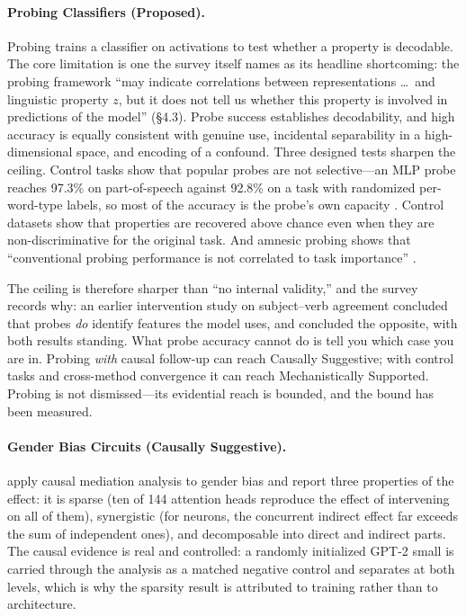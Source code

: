 \documentclass{article}
\begin{document}
\paragraph{Probing Classifiers (Proposed).} Probing \citep{belinkov2022probing} trains a classifier on activations to test whether a property is decodable. The core limitation is one the survey itself names as its headline shortcoming: the probing framework ``may indicate correlations between representations \ldots\ and linguistic property $z$, but it does not tell us whether this property is involved in predictions of the model'' (\S4.3). Probe success establishes decodability, and high accuracy is equally consistent with genuine use, incidental separability in a high-dimensional space, and encoding of a confound. Three designed tests sharpen the ceiling. Control tasks show that popular probes are not selective---an MLP probe reaches 97.3\% on part-of-speech against 92.8\% on a task with randomized per-word-type labels, so most of the accuracy is the probe's own capacity \citep{hewitt2019designing}. Control datasets show that properties are recovered above chance even when they are non-discriminative for the original task. And amnesic probing shows that ``conventional probing performance is not correlated to task importance'' \citep{elazar2021amnesic}.

The ceiling is therefore sharper than ``no internal validity,'' and the survey records why: an earlier intervention study on subject--verb agreement concluded that probes \emph{do} identify features the model uses, and \citet{elazar2021amnesic} concluded the opposite, with both results standing. What probe accuracy cannot do is tell you which case you are in. Probing \emph{with} causal follow-up can reach Causally Suggestive; with control tasks and cross-method convergence it can reach Mechanistically Supported. Probing is not dismissed---its evidential reach is bounded, and the bound has been measured.

\paragraph{Gender Bias Circuits (Causally Suggestive).} \citet{vig2020gender} apply causal mediation analysis to gender bias and report three properties of the effect: it is sparse (ten of 144 attention heads reproduce the effect of intervening on all of them), synergistic (for neurons, the concurrent indirect effect far exceeds the sum of independent ones), and decomposable into direct and indirect parts. The causal evidence is real and controlled: a randomly initialized GPT-2 small is carried through the analysis as a matched negative control and separates at both levels, which is why the sparsity result is attributed to training rather than to architecture.
\end{document}
